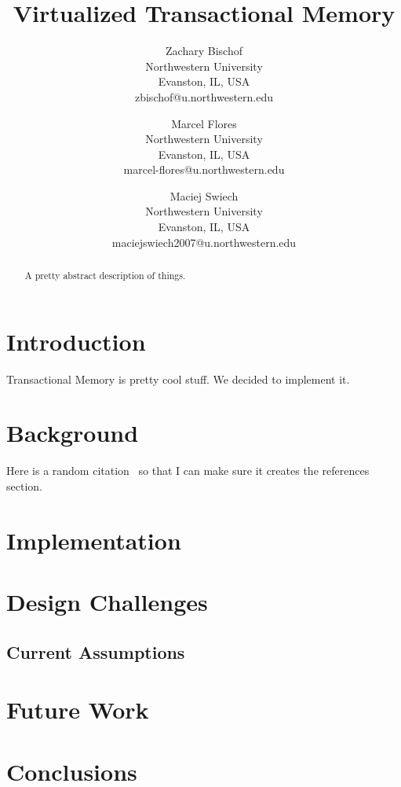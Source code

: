\documentclass{acm_proc_article-sp}
\title{Virtualized Transactional Memory}
\author{Zachary Bischof \\
	Northwestern University\\
	Evanston, IL, USA\\
	zbischof@u.northwestern.edu
	\and 
	Marcel Flores \\
	Northwestern University\\
	Evanston, IL, USA\\
	marcel-flores@u.northwestern.edu
	\and
	Maciej Swiech \\
	Northwestern University\\
	Evanston, IL, USA\\
	maciejswiech2007@u.northwestern.edu
	}
\begin{document}
\maketitle

\begin{abstract}
A pretty abstract description of things.
\end{abstract}

\section{Introduction}
Transactional Memory is pretty cool stuff. We decided to implement it.

\section{Background}
Here is a random citation~\cite{Herlihy:1993:TMA:173682.165164} so that I can make sure it creates the references section.

\section{Implementation}

\section{Design Challenges}

\subsection{Current Assumptions}

\section{Future Work}

\section{Conclusions}


\end{document}

